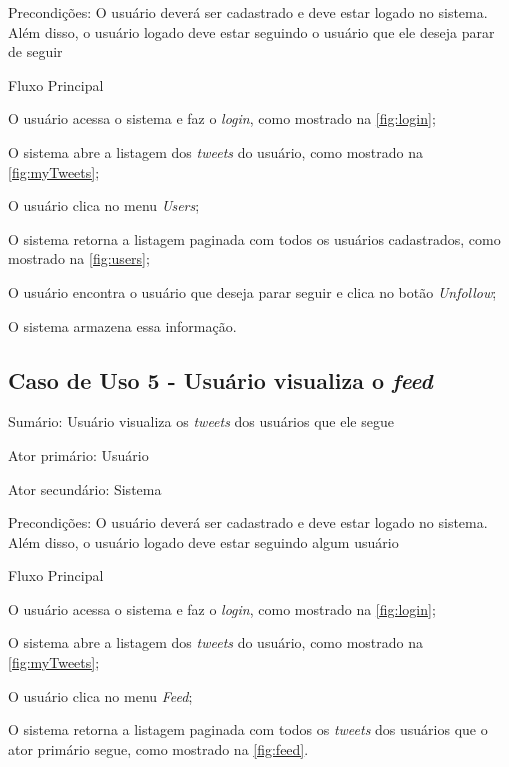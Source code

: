 Precondições: O usuário deverá ser cadastrado e deve estar logado no sistema. Além disso, o usuário logado deve estar seguindo o usuário que ele deseja parar de seguir

Fluxo Principal
\begin{enumerate}
{\setlength\itemindent{25pt}
\item O usuário acessa o sistema e faz o \textit{login}, como mostrado na \autoref{fig:login};
\item O sistema abre a listagem dos \textit{tweets} do usuário, como mostrado na \autoref{fig:myTweets};
\item O usuário clica no menu \textit{Users};
\item O sistema retorna a listagem paginada com todos os usuários cadastrados, como mostrado na \autoref{fig:users};
\item O usuário encontra o usuário que deseja parar seguir e clica no botão \textit{Unfollow};
\item O sistema armazena essa informação.
}
\end{enumerate}

\subsection{Caso de Uso 5 - Usuário visualiza o \textit{feed}}
\label{subsec:useCaseFeed}

Sumário: Usuário visualiza os \textit{tweets} dos usuários que ele segue

Ator primário: Usuário

Ator secundário: Sistema

Precondições: O usuário deverá ser cadastrado e deve estar logado no sistema. Além disso, o usuário logado deve estar seguindo algum usuário

Fluxo Principal
\begin{enumerate}
{\setlength\itemindent{25pt}
\item O usuário acessa o sistema e faz o \textit{login}, como mostrado na \autoref{fig:login};
\item O sistema abre a listagem dos \textit{tweets} do usuário, como mostrado na \autoref{fig:myTweets};
\item O usuário clica no menu \textit{Feed};
\item O sistema retorna a listagem paginada com todos os \textit{tweets} dos usuários que o ator primário segue, como mostrado na \autoref{fig:feed}.
}
\end{enumerate}

